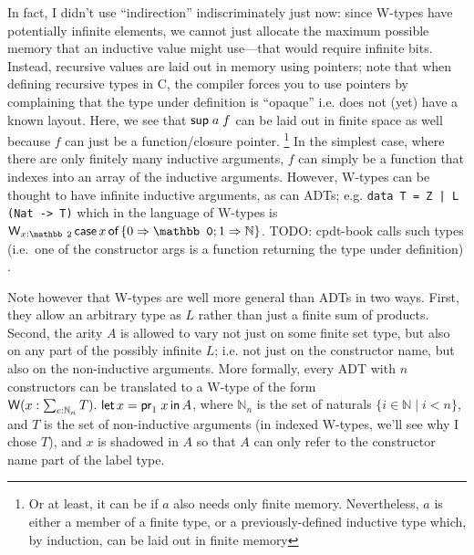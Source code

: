 \documentclass[11pt]{article} %
\theoremstyle{definition}
\theoremstyle{remark}
\newenvironment{aside}
  {\begin{mdframed}[style=0,%
      leftline=false,rightline=false,leftmargin=2em,rightmargin=2em,%
          innerleftmargin=0pt,innerrightmargin=0pt,linewidth=0.75pt,%
      skipabove=7pt,skipbelow=7pt]\small}
  {\end{mdframed}}
\begin{document}
\begin{aside}
  In fact, I didn't use ``indirection'' indiscriminately just now: since W-types have potentially infinite elements, we cannot just allocate the maximum possible memory that an inductive value might use---that would require infinite bits.
  Instead, recursive values are laid out in memory using pointers; note that when defining recursive types in C, the compiler forces you to use pointers by complaining that the type under definition is ``opaque'' i.e. does not (yet) have a known layout.
  Here, we see that $\mathsf{sup}\;a\;f$ can be laid out in finite space as well because $f$ can just be a function/closure pointer.%
    \footnote{Or at least, it can be if $a$ also needs only finite memory. Nevertheless, $a$ is either a member of a finite type, or a previously-defined inductive type which, by induction, can be laid out in finite memory}
  In the simplest case, where there are only finitely many inductive arguments, $f$ can simply be a function that indexes into an array of the inductive arguments.
  However, W-types can be thought to have infinite inductive arguments, as can ADTs; e.g. \texttt{data T = Z | L (Nat -> T)} which in the language of W-types is $\bigW_{x:\mathbb 2}\caseof{x}\{0 \To \mathbb 0; 1 \To \mathbb N\}$.
  TODO: cpdt-book calls such types (i.e.\ one of the constructor args is a function returning the type under definition) .

  Note however that W-types are well more general than ADTs in two ways.
  First, they allow an arbitrary type as $L$ rather than just a finite sum of products.
  Second, the arity $A$ is allowed to vary not just on some finite set type, but also on any part of the possibly infinite $L$; i.e. not just on the constructor name, but also on the non-inductive arguments.
  More formally, every ADT with $n$ constructors can be translated to a W-type of the form $\operatorname{\mathsf{W}}(x:\sum_{c:\mathbb N_n}T).\,\mathinner{\textsf{let}}{x = \mathsf{pr}_1\;x}\mathinner{\textsf{in}} A$, where $\mathbb N_n$ is the set of naturals $\{i \in \mathbb N \mid i < n\}$, and $T$ is the set of non-inductive arguments (in indexed W-types, we'll see why I chose $T$), and $x$ is shadowed in $A$ so that $A$ can only refer to the constructor name part of the label type.
\end{aside}
\end{document}
